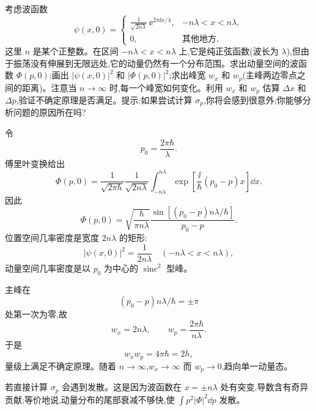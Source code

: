 \begin{question}
考虑波函数
\[
\psi(x,0)=
\begin{cases}
\displaystyle \frac{1}{\sqrt{2n\lambda}}\,\mathrm \ee^{2\pi \ii x/\lambda},& -n\lambda<x<n\lambda,\\[0.4em]
0,& \text{其他地方},
\end{cases}
\]
这里 $n$ 是某个正整数。在区间 $-n\lambda<x<n\lambda$ 上,它是纯正弦函数(波长为 $\lambda$),但由于振荡没有伸展到无限远处,它的动量仍然有一个分布范围。求出动量空间的波函数 $\Phi(p,0)$;画出 $|\psi(x,0)|^2$ 和 $|\Phi(p,0)|^2$;求出峰宽 $w_x$ 和 $w_p$(主峰两边零点之间的距离)。注意当 $n\to\infty$ 时,每一个峰宽如何变化。利用 $w_x$ 和 $w_p$ 估算 $\Delta x$ 和 $\Delta p$,验证不确定原理是否满足。提示:如果尝试计算 $\sigma_p$,你将会感到很意外;你能够分析问题的原因所在吗?
\begin{solution}
令
\[
p_0=\frac{2\pi\hbar}{\lambda}.
\]
傅里叶变换给出
\[
\Phi(p,0)=\frac1{\sqrt{2\pi\hbar}}\frac1{\sqrt{2n\lambda}}
\int_{-n\lambda}^{n\lambda}
\exp\left[\frac{\ii}{\hbar}(p_0-p)x\right]\dd x.
\]
因此
\[
\boxed{\Phi(p,0)=\sqrt{\frac{\hbar}{\pi n\lambda}}
\frac{\sin[(p_0-p)n\lambda/\hbar]}{p_0-p}.}
\]
位置空间几率密度是宽度 $2n\lambda$ 的矩形:
\[
|\psi(x,0)|^2=\frac1{2n\lambda}
\quad(-n\lambda<x<n\lambda),
\]
动量空间几率密度是以 $p_0$ 为中心的 $\operatorname{sinc}^2$ 型峰。

主峰在
\[
(p_0-p)n\lambda/\hbar=\pm\pi
\]
处第一次为零,故
\[
w_x=2n\lambda,
\qquad
w_p=\frac{2\pi\hbar}{n\lambda}.
\]
于是
\[
w_xw_p=4\pi\hbar=2h,
\]
量级上满足不确定原理。随着 $n\to\infty$,$w_x\to\infty$ 而 $w_p\to0$,趋向单一动量态。

若直接计算 $\sigma_p$ 会遇到发散。这是因为波函数在 $x=\pm n\lambda$ 处有突变,导数含有奇异贡献;等价地说,动量分布的尾部衰减不够快,使 $\int p^2|\Phi|^2\dd p$ 发散。
\end{solution}
\end{question}

